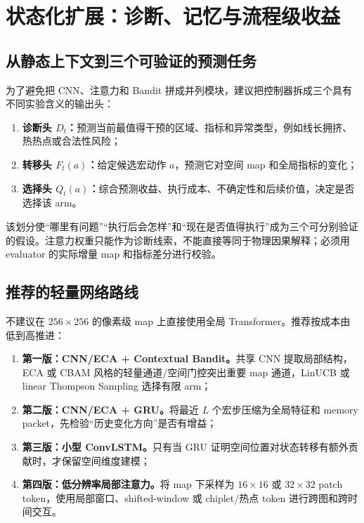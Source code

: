 \documentclass[UTF8,a4paper,11pt]{ctexart}
\begin{document}
\section{状态化扩展：诊断、记忆与流程级收益}

\subsection{从静态上下文到三个可验证的预测任务}

为了避免把 CNN、注意力和 Bandit 拼成并列模块，建议把控制器拆成三个具有不同实验含义的输出头：

\begin{enumerate}
    \item \textbf{诊断头 \(D_t\)：}预测当前最值得干预的区域、指标和异常类型，例如线长拥挤、热热点或合法性风险；
    \item \textbf{转移头 \(F_t(a)\)：}给定候选宏动作 \(a\)，预测它对空间 map 和全局指标的变化；
    \item \textbf{选择头 \(Q_t(a)\)：}综合预测收益、执行成本、不确定性和后续价值，决定是否选择该 arm。
\end{enumerate}

该划分使“哪里有问题”“执行后会怎样”和“现在是否值得执行”成为三个可分别验证的假设。注意力权重只能作为诊断线索，不能直接等同于物理因果解释；必须用 evaluator 的实际增量 map 和指标差分进行校验。

\subsection{推荐的轻量网络路线}

不建议在 \(256\times256\) 的像素级 map 上直接使用全局 Transformer。推荐按成本由低到高推进：

\begin{enumerate}
    \item \textbf{第一版：CNN/ECA + Contextual Bandit。}共享 CNN 提取局部结构，ECA 或 CBAM 风格的轻量通道/空间门控突出重要 map 通道，LinUCB 或 linear Thompson Sampling 选择有限 arm；
    \item \textbf{第二版：CNN/ECA + GRU。}将最近 \(L\) 个宏步压缩为全局特征和 memory packet，先检验“历史变化方向”是否有增益；
    \item \textbf{第三版：小型 ConvLSTM。}只有当 GRU 证明空间位置对状态转移有额外贡献时，才保留空间维度建模；
    \item \textbf{第四版：低分辨率局部注意力。}将 map 下采样为 \(16\times16\) 或 \(32\times32\) patch token，使用局部窗口、shifted-window 或 chiplet/热点 token 进行跨图和跨时间交互。
\end{enumerate}
\end{document}
